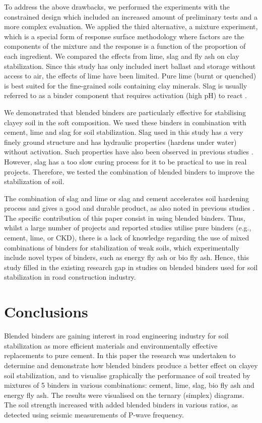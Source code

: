 \documentclass[constrmater,article,submit,pdftex,moreauthors]{Definitions/mdpi}
\begin{document}
To address the above drawbacks, we performed the experiments with the constrained design which included an increased amount of preliminary tests and a more complex evaluation. We applied the third alternative, a mixture experiment, which is a special form of response surface methodology where factors are the components of the mixture and the response is a function of the proportion of each ingredient. We compared the effects from lime, slag and fly ash on clay stabilization. Since this study has only included inert ballast and storage without access to air, the effects of lime have been limited. Pure lime (burnt or quenched) is best suited for the fine-grained soils containing clay minerals. Slag is usually referred to as a binder component that requires activation (high pH) to react \citep{Sherwood,Lindh2022a}. 

We demonstrated that blended binders are particularly effective for stabilising clayey soil in the soft composition. We used these binders in combination with cement, lime and slag for soil stabilization. Slag used in this study has a very finely ground structure and has hydraulic properties (hardens under water) without activation. Such properties have also been observed in previous studies \citep{Lindh2000,Lindh2001}. However, slag has a too slow curing process for it to be practical to use in real projects. Therefore, we tested the combination of blended binders to improve the stabilization of soil. 

The combination of slag and lime or slag and cement accelerates soil hardening process and gives a good and durable product, as also noted in previous studies \cite{Lindh2021a}. The specific contribution of this paper consist in using blended binders. Thus, whilst a large number of projects and reported studies utilise pure binders (e.g., cement, lime, or CKD), there is a lack of knowledge regarding the use of mixed combinations of binders for stabilization of weak soils, which experimentally include novel types of binders, such as energy fly ash or bio fly ash. Hence, this study filled in the existing research gap in studies on blended binders used for soil stabilization in road construction industry.

\section{Conclusions}

Blended binders are gaining interest in road engineering industry for soil stabilization as more efficient materials and environmentally effective replacements to pure cement. In this paper the research was undertaken to determine and demonstrate how blended binders produce a better effect on clayey soil stabilization, and to visualise graphically the performance of soil treated by mixtures of 5 binders in various combinations: cement, lime, slag, bio fly ash and energy fly ash. The results were visualised on the ternary (simplex) diagrams. The soil strength increased with added blended binders in various ratios, as detected using seismic measurements of P-wave frequency. 
\end{document}
